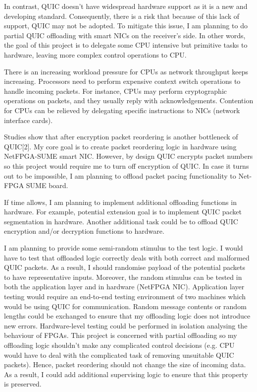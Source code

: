 \documentclass[a4paper,12pt]{article}
\begin{document}
In contrast, QUIC doesn't have widespread hardware support as it is a new and developing standard.
Consequently, there is a risk that because of this lack of support, QUIC may not be adopted.
To mitigate this issue, I am planning to do partial QUIC offloading with smart NICs on the receiver's side.
In other words, the goal of this project is to delegate some CPU intensive but primitive tasks to hardware, leaving more complex control operations to CPU.

There is an increasing workload pressure for CPUs as network throughput keeps increasing.
Processors need to perform expensive context switch operations to handle incoming packets.
For instance, CPUs may perform cryptographic operations on packets, and they usually reply with acknowledgements.
Contention for CPUs can be relieved by delegating specific instructions to NICs (network interface cards).

Studies show that after encryption packet reordering is another bottleneck of QUIC[2].	
My core goal is to create packet reordering logic in hardware using NetFPGA-SUME smart NIC.
However, by design QUIC encrypts packet numbers so this project would require me to turn off encryption of QUIC. 
In case it turns out to be impossible, I am planning to offload packet pacing functionality to Net-FPGA SUME board.

If time allows, I am planning to implement additional offloading functions in hardware.
For example, potential extension goal is to implement QUIC packet segmentation in hardware.
Another additional task could be to offload QUIC encryption and/or decryption functions to hardware.

I am planning to provide some semi-random stimulus to the test logic. 
I would have to test that offloaded logic correctly deals with both correct and malformed QUIC packets. 
As a result, I should randomise payload of the potential packets to have representative inputs. 
Moreover, the random stimulus can be tested in both the application layer and in hardware (NetFPGA NIC). 
Application layer testing would require an end-to-end testing environment of two machines which would be using QUIC for communication. 
Random message contents or random lengths could be exchanged to ensure that my offloading logic does not introduce new errors. 
Hardware-level testing could be performed in isolation analysing the behaviour of FPGAs. 
This project is concerned with partial offloading so my offloading logic shouldn’t make any complicated control decisions (e.g. CPU would have to deal with the complicated task of removing unsuitable QUIC packets). 
Hence, packet reordering should not change the size of incoming data. 
As a result, I could add additional supervising logic to ensure that this property is preserved. 
\end{document}
